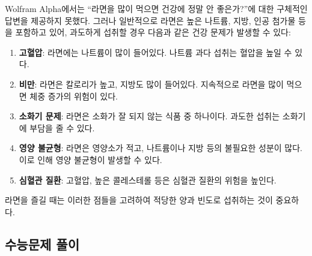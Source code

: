 \documentclass[
  letterpaper,
]{book}
\begin{document}
\begin{tcolorbox}[enhanced jigsaw, opacityback=0, opacitybacktitle=0.6, colback=white, rightrule=.15mm, coltitle=black, colframe=quarto-callout-note-color-frame, colbacktitle=quarto-callout-note-color!10!white, bottomrule=.15mm, bottomtitle=1mm, breakable, title=\textcolor{quarto-callout-note-color}{\faInfo}\hspace{0.5em}{라면을 많이 먹으면 건강에 정말 안좋은가?}, titlerule=0mm, leftrule=.75mm, toptitle=1mm, left=2mm, arc=.35mm, toprule=.15mm]

Wolfram Alpha에서는 ``라면을 많이 먹으면 건강에 정말 안 좋은가?''에 대한
구체적인 답변을 제공하지 못했다. 그러나 일반적으로 라면은 높은 나트륨,
지방, 인공 첨가물 등을 포함하고 있어, 과도하게 섭취할 경우 다음과 같은
건강 문제가 발생할 수 있다:

\begin{enumerate}
\def\labelenumi{\arabic{enumi}.}
\item
  \textbf{고혈압}: 라면에는 나트륨이 많이 들어있다. 나트륨 과다 섭취는
  혈압을 높일 수 있다.
\item
  \textbf{비만}: 라면은 칼로리가 높고, 지방도 많이 들어있다. 지속적으로
  라면을 많이 먹으면 체중 증가의 위험이 있다.
\item
  \textbf{소화기 문제}: 라면은 소화가 잘 되지 않는 식품 중 하나이다.
  과도한 섭취는 소화기에 부담을 줄 수 있다.
\item
  \textbf{영양 불균형}: 라면은 영양소가 적고, 나트륨이나 지방 등의
  불필요한 성분이 많다. 이로 인해 영양 불균형이 발생할 수 있다.
\item
  \textbf{심혈관 질환}: 고혈압, 높은 콜레스테롤 등은 심혈관 질환의
  위험을 높인다.
\end{enumerate}

라면을 즐길 때는 이러한 점들을 고려하여 적당한 양과 빈도로 섭취하는 것이
중요하다.

\end{tcolorbox}

\hypertarget{uxc218uxb2a5uxbb38uxc81c-uxd480uxc774}{%
\subsection{수능문제 풀이}\label{uxc218uxb2a5uxbb38uxc81c-uxd480uxc774}}

{}
\end{document}
